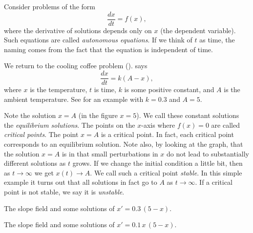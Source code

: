 
Consider
problems of the form
\begin{equation*}
\frac{dx}{dt} = f(x) ,
\end{equation*}
where the derivative of solutions depends only on $x$ (the dependent
variable).  Such equations are called \emph{autonomous
equations}.  If we think
of $t$ as time, the naming comes from the fact that the equation is
independent of time.

We return to the cooling coffee problem
().
says
\begin{equation*}
\frac{dx}{dt} = k (A-x) ,
\end{equation*}
where $x$ is the temperature, $t$ is time, $k$ is some positive constant,
and $A$ is
the ambient temperature.  See  for an example
with $k=0.3$ and $A=5$.

Note the solution $x=A$ (in the figure $x=5$).
We call these constant solutions the
\emph{equilibrium solutions}.
The points on the $x$-axis where $f(x) = 0$ are called
\emph{critical points}.  The point
$x=A$ is a critical point.  In fact, each
critical point corresponds to an equilibrium solution.
Note also, by looking at the graph, that the solution $x=A$ is
 in
that small perturbations in $x$ do not lead to substantially different
solutions as $t$ grows.
If we change the initial condition a little bit, then as 
$t \to \infty$ we get $x(t) \to A$.  We call such a critical point
\emph{stable}.
In this simple example it turns out that all solutions in fact go to $A$
as $t \to \infty$.  If a critical point is not stable, we say it is
\emph{unstable}.

\begin{myfig}
\parbox[t]{3.0in}{
 \capstart
 \caption{The slope field and some solutions of
 $x' = 0.3\,(5-x)$.\label{2.2:coffeefig}}
}
\quad
\parbox[t]{3.0in}{
 \capstart
 \caption{The slope field and some solutions of
 $x' = 0.1\,x\,(5-x)$.\label{2.2:logisticfig}}
}
\end{myfig}

